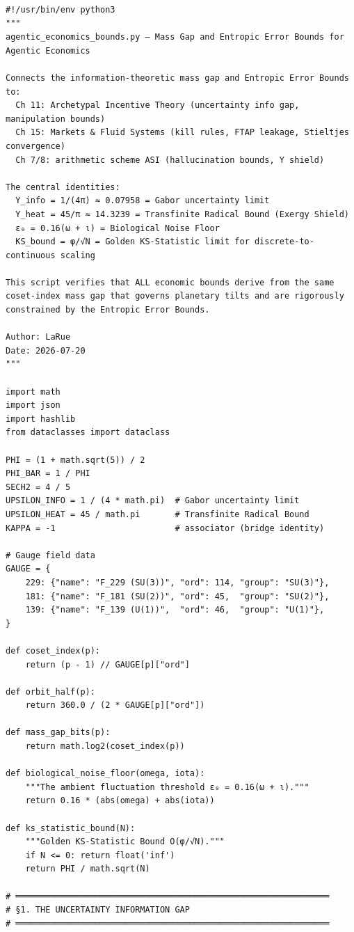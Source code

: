 \begin{verbatim}
#!/usr/bin/env python3
"""
agentic_economics_bounds.py — Mass Gap and Entropic Error Bounds for Agentic Economics

Connects the information-theoretic mass gap and Entropic Error Bounds to:
  Ch 11: Archetypal Incentive Theory (uncertainty info gap, manipulation bounds)
  Ch 15: Markets & Fluid Systems (kill rules, FTAP leakage, Stieltjes convergence)
  Ch 7/8: arithmetic scheme ASI (hallucination bounds, Υ shield)

The central identities:
  Υ_info = 1/(4π) ≈ 0.07958 = Gabor uncertainty limit
  Υ_heat = 45/π ≈ 14.3239 = Transfinite Radical Bound (Exergy Shield)
  ε₀ = 0.16(ω + ι) = Biological Noise Floor
  KS_bound = φ/√N = Golden KS-Statistic limit for discrete-to-continuous scaling

This script verifies that ALL economic bounds derive from the same
coset-index mass gap that governs planetary tilts and are rigorously
constrained by the Entropic Error Bounds.

Author: LaRue
Date: 2026-07-20
"""

import math
import json
import hashlib
from dataclasses import dataclass

PHI = (1 + math.sqrt(5)) / 2
PHI_BAR = 1 / PHI
SECH2 = 4 / 5
UPSILON_INFO = 1 / (4 * math.pi)  # Gabor uncertainty limit
UPSILON_HEAT = 45 / math.pi       # Transfinite Radical Bound
KAPPA = -1                        # associator (bridge identity)

# Gauge field data
GAUGE = {
    229: {"name": "F_229 (SU(3))", "ord": 114, "group": "SU(3)"},
    181: {"name": "F_181 (SU(2))", "ord": 45,  "group": "SU(2)"},
    139: {"name": "F_139 (U(1))",  "ord": 46,  "group": "U(1)"},
}

def coset_index(p):
    return (p - 1) // GAUGE[p]["ord"]

def orbit_half(p):
    return 360.0 / (2 * GAUGE[p]["ord"])

def mass_gap_bits(p):
    return math.log2(coset_index(p))

def biological_noise_floor(omega, iota):
    """The ambient fluctuation threshold ε₀ = 0.16(ω + ι)."""
    return 0.16 * (abs(omega) + abs(iota))

def ks_statistic_bound(N):
    """Golden KS-Statistic Bound O(φ/√N)."""
    if N <= 0: return float('inf')
    return PHI / math.sqrt(N)

# ═══════════════════════════════════════════════════════════════
# §1. THE UNCERTAINTY INFORMATION GAP
# ═══════════════════════════════════════════════════════════════


\end{verbatim}
